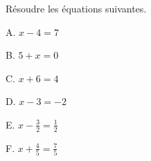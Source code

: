 
Résoudre les équations suivantes.

\begin{description}
\begin{minipage}{0.33\linewidth}
\item[A.] $x-4 = 7$ 
\item[B.] $5+x = 0$
\end{minipage}
\begin{minipage}{0.33\linewidth}
\item[C.] $x + 6 = 4$
\item[D.] $x -3 = -2$
\end{minipage}
\begin{minipage}{0.33\linewidth}
\item[E.] $x - \frac{3}{2} = \frac{1}{2}$
\item[F.] $x + \frac{4}{5} = \frac{7}{5}$
\end{minipage}
\end{description}